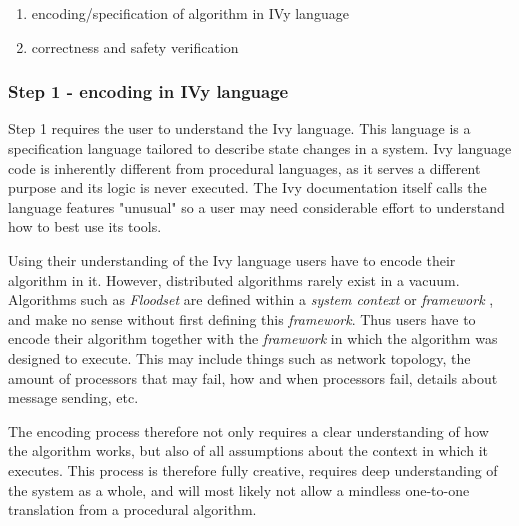 \documentclass[fleqn]{article}
\begin{document}
\begin{enumerate}
  \item encoding/specification of algorithm in IVy language
  \item correctness and safety verification
\end{enumerate}

\subsubsection{Step 1 - encoding in IVy language}
Step 1 requires the user to understand the Ivy language. This language is a specification language tailored to describe state changes in a system. Ivy language code is inherently different from procedural languages, as it serves a different purpose and its logic is never executed. The Ivy documentation itself calls the language features "unusual" \cite{refLanguageDoc} so a user may need considerable effort to understand how to best use its tools.

Using their understanding of the Ivy language users have to encode their algorithm in it. However, distributed algorithms rarely exist in a vacuum. Algorithms such as \textit{Floodset} are defined within a \textit{system context} or \textit{framework} \cite{refNancy}, and make no sense without first defining this \textit{framework}. Thus users have to encode their algorithm together with the \textit{framework} in which the algorithm was designed to execute. This may include things such as network topology, the amount of processors that may fail, how and when processors fail, details about message sending, etc.

The encoding process therefore not only requires a clear understanding of how the algorithm works, but also of all assumptions about the context in which it executes. This process is therefore fully creative, requires deep understanding of the system as a whole, and will most likely not allow a mindless one-to-one translation from a procedural algorithm.
\end{document}
